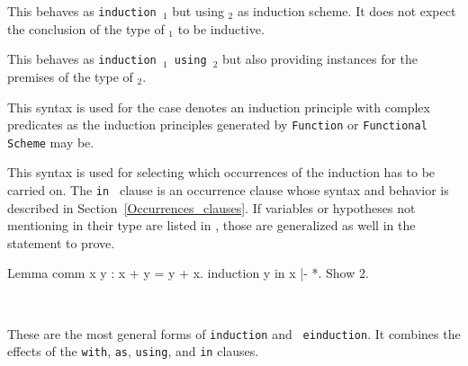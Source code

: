 \begin{Variants}
\item {}

  This behaves as {\tt induction {\term$_1$}} but using {\term$_2$} as
  induction scheme. It does not expect the conclusion of the type of
  {\term$_1$} to be inductive.

\item {}

  This behaves as {\tt induction {\term$_1$} using {\term$_2$}} but
  also providing instances for the premises of the type of {\term$_2$}.

\item {}

  This syntax is used for the case {\qualid} denotes an induction principle
  with complex predicates as the induction principles generated by
  {\tt Function} or {\tt Functional Scheme} may be.

\item {}

  This syntax is used for selecting which occurrences of {\term} the
  induction has to be carried on. The {\tt in \occgoalset} clause is
  an occurrence clause whose syntax and behavior is described in
  Section~\ref{Occurrences_clauses}. If variables or hypotheses not
  mentioning {\term} in their type are listed in {\occgoalset}, those
  are generalized as well in the statement to prove.

\Example

\begin{coq_example}
Lemma comm x y : x + y = y + x.
induction y in x |- *.
Show 2.
\end{coq_example}

\item {}\\
     {}

  These are the most general forms of {\tt induction} and {\tt
  einduction}.  It combines the effects of the {\tt with}, {\tt as}, %
  {\tt using}, and {\tt in} clauses.


\end{Variants}
